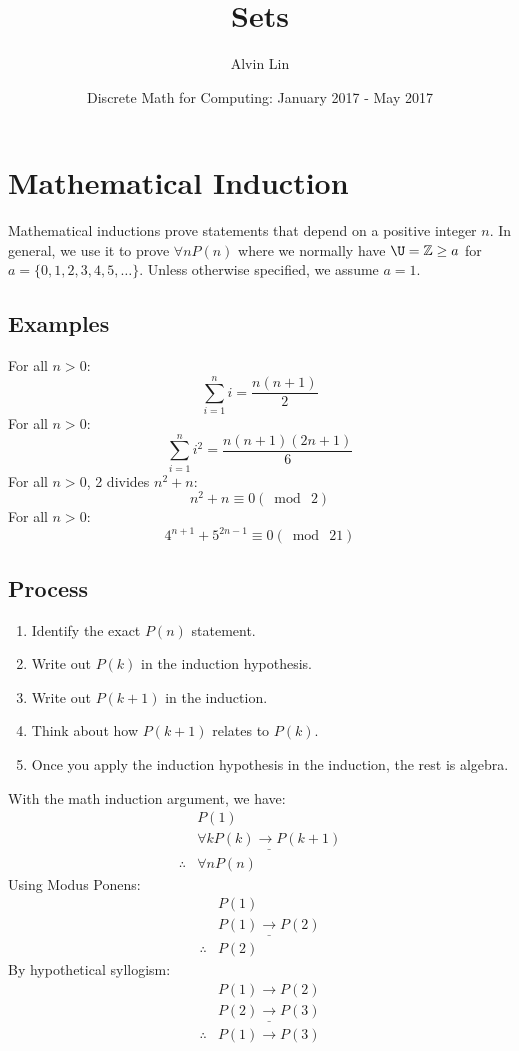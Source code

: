 \documentclass{math}
\title{Sets}
\author{Alvin Lin}
\date{Discrete Math for Computing: January 2017 - May 2017}
\begin{document}
\maketitle

\section*{Mathematical Induction}
Mathematical inductions prove statements that depend on a positive integer
\( n \). In general, we use it to prove \( \forall{n}P(n) \) where we
normally have \( \U = \Z\geq a \) for \( a = \{0,1,2,3,4,5,\dots\} \).
Unless otherwise specified, we assume \( a = 1 \).

\subsection*{Examples}
For all \( n > 0 \):
\[ \sum_{i=1}^{n}i = \frac{n(n+1)}{2} \]
For all \( n > 0 \):
\[ \sum_{i=1}^{n}i^{2} = \frac{n(n+1)(2n+1)}{6} \]
For all \( n > 0 \), 2 divides \( n^{2} + n \):
\[ n^{2}+n \equiv 0(\bmod\ 2) \]
For all \( n > 0 \):
\[ 4^{n+1}+5^{2n-1} \equiv 0(\bmod\ 21) \]

\subsection*{Process}
\begin{enumerate}
  \item Identify the exact \( P(n) \) statement.
  \item Write out \( P(k) \) in the induction hypothesis.
  \item Write out \( P(k+1) \) in the induction.
  \item Think about how \( P(k+1) \) relates to \( P(k) \).
  \item Once you apply the induction hypothesis in the induction, the rest is
    algebra.
\end{enumerate}
With the math induction argument, we have:
\begin{align*}
  & P(1) \\
  & \underline{\forall{k}P(k)\to P(k+1)} \\
  \therefore{} & \forall{n}P(n)
\end{align*}
Using Modus Ponens:
\begin{align*}
  & P(1) \\
  & \underline{P(1)\to P(2)} \\
  \therefore{} & P(2)
\end{align*}
By hypothetical syllogism:
\begin{align*}
  & P(1)\to P(2) \\
  & \underline{P(2)\to P(3)} \\
  \therefore{} & P(1)\to P(3) \\
\end{align*}
\end{document}
